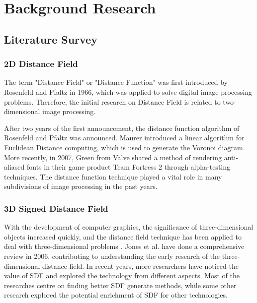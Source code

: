 \chapter{Background Research}
\label{chapter2}

\section{Literature Survey}

\subsection{2D Distance Field}

The term "Distance Field" or "Distance Function" was first introduced by Rosenfeld and Pfaltz \cite{FirstDistancefield} in 1966, which was applied to solve digital image processing problems. Therefore, the initial research on Distance Field is related to two-dimensional image processing. 

\hspace*{\fill}

After two years of the first announcement, the distance function algorithm of Rosenfeld and Pfaltz was announced\cite{ROSENFELD196833}.
Maurer \cite{linearEDT}introduced a linear algorithm for Euclidean Distance computing, which is used to generate the Voronoi diagram. More recently, in 2007, Green \cite{Green07Fonts} from Valve shared a method of rendering anti-aliased fonts in their game product Team Fortress 2 through alpha-testing techniques. The distance function technique played a vital role in many subdivisions of image processing in the past years.

\subsection{3D Signed Distance Field}
\label{br:3dsdf}

With the development of computer graphics, the significance of three-dimensional objects increased quickly, and the distance field technique has been applied to deal with three-dimensional problems \cite{3DDFmeta} \cite{SDFSurvey}. Jones et al. \cite{SDFSurvey} have done a comprehensive review in 2006, contributing to understanding the early research of the three-dimensional distance field. In recent years, more researchers have noticed the value of SDF and explored the technology from different aspects. Most of the researches centre on finding better SDF generate methods, while some other research explored the potential enrichment of SDF for other technologies.

